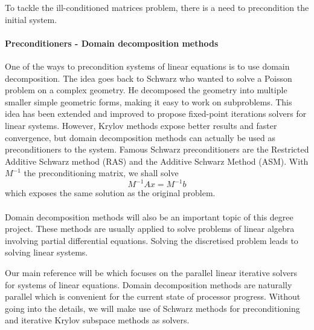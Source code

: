 To tackle the ill-conditioned matrices problem, there is a need to precondition the initial system.


\paragraph{Preconditioners - Domain decomposition methods}
One of the ways to precondition systems of linear equations is to use domain decomposition.
The idea goes back to Schwarz who wanted to solve a Poisson problem on a complex geometry.
He decomposed the geometry into multiple smaller simple geometric forms, making it easy to work on subproblems.
This idea has been extended and improved to propose fixed-point iterations solvers for linear systems.
However, Krylov methods expose better results and faster convergence, but domain decomposition methods can actually be used as preconditioners to the system.
Famous Schwarz preconditioners are the Restricted Additive Schwarz method (RAS) and the Additive Schwarz Method (ASM).
With \(M^{-1}\) the preconditioning matrix, we shall solve
\[M^{-1}Ax = M^{-1}b\]
which exposes the same solution as the original problem.

\paragraph{}
Domain decomposition methods will also be an important topic of this degree project.
These methods are usually applied to solve problems of linear algebra involving partial differential equations.
Solving the discretised problem leads to solving linear systems.

Our main reference will be \cite{dolean_domain_2015} which focuses on the parallel linear iterative solvers for systems of linear equations.
Domain decomposition methods are naturally parallel which is convenient for the current state of processor progress.
Without going into the details, we will make use of Schwarz methods for preconditioning and iterative Krylov subspace methods as solvers.
